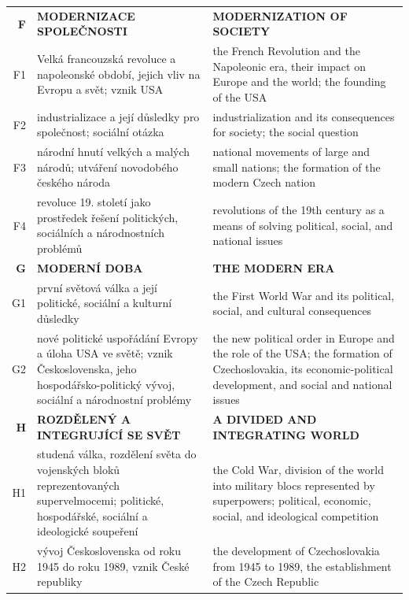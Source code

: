 \documentclass[]{interact}
\theoremstyle{plain}%
\theoremstyle{definition}
\theoremstyle{remark}
\begin{document}
\begin{table}
{\begin{tabular}{r|p{10cm}|p{10cm}}
\textbf{F} & \textbf{MODERNIZACE SPOLEČNOSTI} & \textbf{MODERNIZATION OF SOCIETY} \\ 
F1 & Velká francouzská revoluce a napoleonské období, jejich vliv na Evropu a svět; vznik USA & the French Revolution and the Napoleonic era, their impact on Europe and the world; the founding of the USA \\ 
F2 & industrializace a její důsledky pro společnost; sociální otázka & industrialization and its consequences for society; the social question \\ 
F3 & národní hnutí velkých a malých národů; utváření novodobého českého národa & national movements of large and small nations; the formation of the modern Czech nation \\ 
F4 & revoluce 19. století jako prostředek řešení politických, sociálních a národnostních problémů & revolutions of the 19th century as a means of solving political, social, and national issues \\ \hline

\textbf{G} & \textbf{MODERNÍ DOBA} & \textbf{THE MODERN ERA} \\ 
G1 & první světová válka a její politické, sociální a kulturní důsledky & the First World War and its political, social, and cultural consequences \\ 
G2 & nové politické uspořádání Evropy a úloha USA ve světě; vznik Československa, jeho hospodářsko-politický vývoj, sociální a národnostní problémy & the new political order in Europe and the role of the USA; the formation of Czechoslovakia, its economic-political development, and social and national issues \\ \hline

\textbf{H} & \textbf{ROZDĚLENÝ A INTEGRUJÍCÍ SE SVĚT} & \textbf{A DIVIDED AND INTEGRATING WORLD} \\ 
H1 & studená válka, rozdělení světa do vojenských bloků reprezentovaných supervelmocemi; politické, hospodářské, sociální a ideologické soupeření & the Cold War, division of the world into military blocs represented by superpowers; political, economic, social, and ideological competition \\ 
H2 & vývoj Československa od roku 1945 do roku 1989, vznik České republiky & the development of Czechoslovakia from 1945 to 1989, the establishment of the Czech Republic \\
\end{tabular}}\label{table:national-curriculum-topics}

\end{table}
\end{document}
